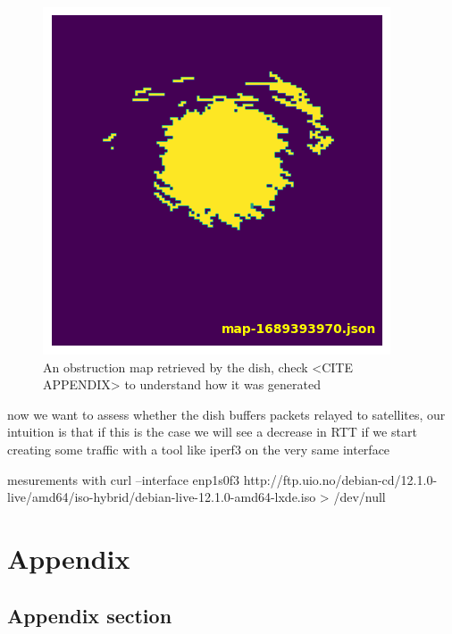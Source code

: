 \documentclass[IN,11pt,twoside,openright,bachelor,english]{tumthesis}
\begin{document}
\begin{figure}
	\centering
	\includegraphics[]{img/obstruction_map_finale.png}
	\caption{An obstruction map retrieved by the dish, check <CITE APPENDIX> to understand how it was generated}
\end{figure}

now we want to assess whether the dish buffers packets relayed to satellites, our intuition is that if this is the case we will see a decrease in RTT if we start creating some traffic with a tool like iperf3 on the very same interface

mesurements with  curl --interface enp1s0f3 http://ftp.uio.no/debian-cd/12.1.0-live/amd64/iso-hybrid/debian-live-12.1.0-amd64-lxde.iso > /dev/null

\appendix
\chapter{Appendix}
\label{chap:appendix}

\section{Appendix section}
\end{document}
